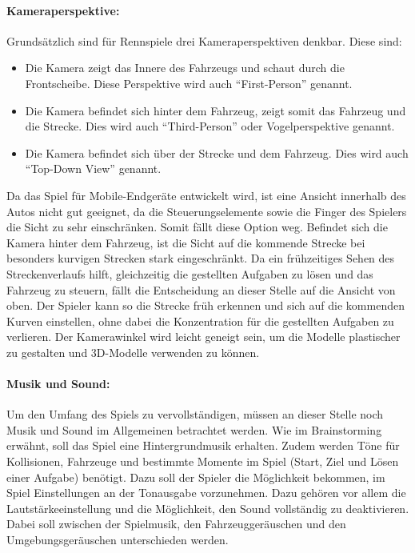 		\paragraph{Kameraperspektive:}
		Grundsätzlich sind für Rennspiele drei Kameraperspektiven denkbar. Diese sind:
		\begin{itemize}
			\item{ Die Kamera zeigt das Innere des Fahrzeugs und schaut durch die Frontscheibe. Diese Perspektive wird auch \enquote{First-Person} genannt. }
			\item{ Die Kamera befindet sich hinter dem Fahrzeug, zeigt somit das Fahrzeug und die Strecke. Dies wird auch \enquote{Third-Person} oder Vogelperspektive genannt. }
			\item{ Die Kamera befindet sich über der Strecke und dem Fahrzeug. Dies wird auch \enquote{Top-Down View} genannt. }
		\end{itemize}
		Da das Spiel für Mobile-Endgeräte entwickelt wird, ist eine Ansicht innerhalb des Autos nicht gut geeignet, da die Steuerungselemente sowie die Finger des Spielers die Sicht zu sehr einschränken. Somit fällt diese Option weg.
		Befindet sich die Kamera hinter dem Fahrzeug, ist die Sicht auf die kommende Strecke bei besonders kurvigen Strecken stark eingeschränkt. Da ein frühzeitiges Sehen des Streckenverlaufs hilft, gleichzeitig die gestellten Aufgaben zu lösen und das Fahrzeug zu steuern, fällt die Entscheidung an dieser Stelle auf die Ansicht von oben.
		Der Spieler kann so die Strecke früh erkennen und sich auf die kommenden Kurven einstellen, ohne dabei die Konzentration für die gestellten Aufgaben zu verlieren. Der Kamerawinkel wird leicht geneigt sein, um die Modelle plastischer zu gestalten und 3D-Modelle verwenden zu können.

		\paragraph{Musik und Sound:}
		Um den Umfang des Spiels zu vervollständigen, müssen an dieser Stelle noch Musik und Sound im Allgemeinen betrachtet werden. Wie im Brainstorming erwähnt, soll das Spiel eine Hintergrundmusik erhalten. Zudem werden Töne für Kollisionen, Fahrzeuge und bestimmte Momente im Spiel (Start, Ziel und Lösen einer Aufgabe) benötigt.
		Dazu soll der Spieler die Möglichkeit bekommen, im Spiel Einstellungen an der Tonausgabe vorzunehmen. Dazu gehören vor allem die Lautstärkeeinstellung und die Möglichkeit, den Sound vollständig zu deaktivieren. Dabei soll zwischen der Spielmusik, den Fahrzeuggeräuschen und den Umgebungsgeräuschen unterschieden werden.

